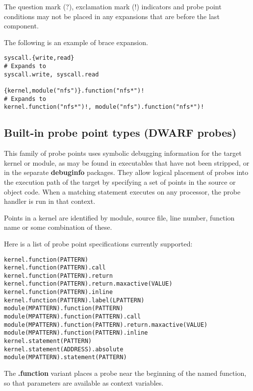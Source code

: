 \documentclass[twoside,english]{article}
\newenvironment{vindent}
{\begin{list}{}{\setlength{\listparindent}{6pt}}
\item[]}
{\end{list}}
\begin{document}
The question mark (?), exclamation mark (!) indicators and probe point conditions
may not be placed in any expansions that are before the last component.

The following is an example of brace expansion.

\begin{vindent}
\begin{verbatim}
syscall.{write,read}
# Expands to
syscall.write, syscall.read

{kernel,module("nfs")}.function("nfs*")!
# Expands to
kernel.function("nfs*")!, module("nfs").function("nfs*")!
\end{verbatim}
\end{vindent}

\subsection{Built-in probe point types (DWARF probes)}
\label{dwarfprobes}
This family of probe points uses symbolic debugging information for the target
kernel or module, as may be found in executables that have not
been stripped, or in the separate \textbf{debuginfo} packages. They allow
logical placement of probes into the execution path of the target
by specifying a set of points in the source or object code. When a matching
statement executes on any processor, the probe handler is run in that context.

Points in a kernel are identified by module, source file, line number, function
name or some combination of these.

Here is a list of probe point specifications currently supported:

\begin{vindent}
\begin{verbatim}
kernel.function(PATTERN)
kernel.function(PATTERN).call
kernel.function(PATTERN).return
kernel.function(PATTERN).return.maxactive(VALUE)
kernel.function(PATTERN).inline
kernel.function(PATTERN).label(LPATTERN)
module(MPATTERN).function(PATTERN)
module(MPATTERN).function(PATTERN).call
module(MPATTERN).function(PATTERN).return.maxactive(VALUE)
module(MPATTERN).function(PATTERN).inline
kernel.statement(PATTERN)
kernel.statement(ADDRESS).absolute
module(MPATTERN).statement(PATTERN)
\end{verbatim}
\end{vindent}

The \textbf{.function} variant places a probe near the beginning of the named
function, so that parameters are available as context variables.
\end{document}
